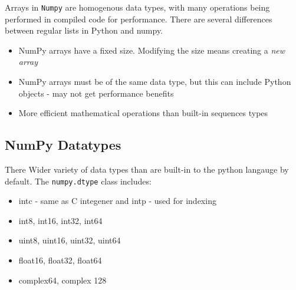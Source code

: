 \documentclass[english, 10pt]{article}
\begin{document}
\begin{tcolorbox}[title=Aside: Numpy Arrays,colframe=black,colback=white,arc=0pt,fonttitle=\bfseries]
Arrays in \texttt{Numpy} are homogenous data types, with many operations being performed in compiled code for performance. There are several differences between regular lists in Python and numpy.
\begin{itemize}
	\item NumPy arrays have a fixed size. Modifying the size means creating a \textit{new array}
	\item NumPy arrays must be of the same data type, but this can include Python objects - may not get performance benefits
	\item More efficient mathematical operations than built-in sequences types
\end{itemize}
\end{tcolorbox}
\subsection{NumPy Datatypes}
There Wider variety of data types than are built-in to the python langauge by default. The \texttt{numpy.dtype} class includes:
\begin{itemize}
	\item intc - same as C integener and intp - used for indexing
	\item int8, int16, int32, int64
	\item uint8, uint16, uint32, uint64
	\item float16, float32, float64
	\item complex64, complex 128
\end{itemize}
\end{document}

